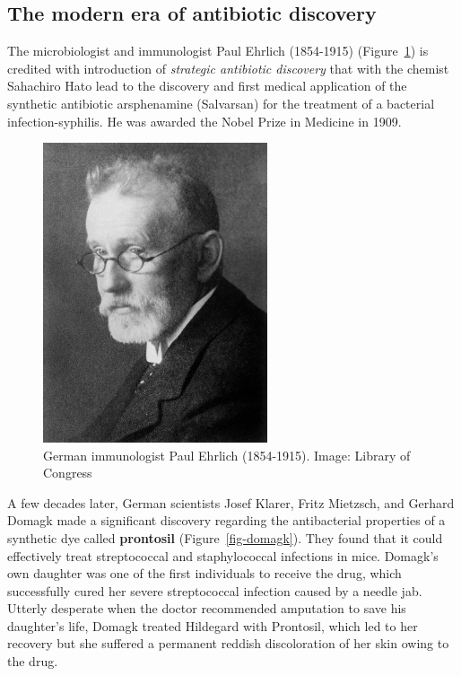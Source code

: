 \documentclass[
  letterpaper,
  DIV=11,
  numbers=noendperiod]{scrreprt}
\begin{document}
\hypertarget{the-modern-era-of-antibiotic-discovery}{%
\subsection{The modern era of antibiotic
discovery}\label{the-modern-era-of-antibiotic-discovery}}

The microbiologist and immunologist Paul Ehrlich (1854-1915)
(Figure~\ref{fig-paulerlich}) is credited with introduction of
\emph{strategic antibiotic discovery} that with the chemist Sahachiro
Hato lead to the discovery and first medical application of the
synthetic antibiotic arsphenamine (Salvarsan) for the treatment of a
bacterial infection-syphilis. He was awarded the Nobel Prize in Medicine
in 1909.

\begin{figure}

{\centering 

\includegraphics[width=2.60417in,height=\textheight]{images/Paul_Ehrlich_1915.jpg}

}

\caption{\label{fig-paulerlich}German immunologist Paul Ehrlich
(1854-1915). Image: Library of Congress}

\end{figure}

A few decades later, German scientists Josef Klarer, Fritz Mietzsch, and
Gerhard Domagk made a significant discovery regarding the antibacterial
properties of a synthetic dye called \textbf{prontosil}
(Figure~\ref{fig-domagk}). They found that it could effectively treat
streptococcal and staphylococcal infections in mice. Domagk's own
daughter was one of the first individuals to receive the drug, which
successfully cured her severe streptococcal infection caused by a needle
jab. Utterly desperate when the doctor recommended amputation to save
his daughter's life, Domagk treated Hildegard with Prontosil, which led
to her recovery but she suffered a permanent reddish discoloration of
her skin owing to the drug.
\end{document}
